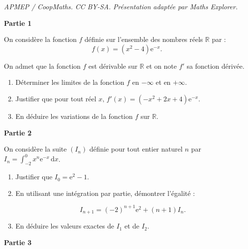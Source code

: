 \documentclass[10pt]{article}
\providecommand{\R}{\mathbb{R}}
\providecommand{\e}{{\mathrm{e}}}
\begin{document}
\noindent\textit{APMEP / CoopMaths. CC BY-SA. Présentation adaptée par Maths Explorer.}\par\medskip
\medskip

\textbf{Partie 1}

\medskip

On considère la fonction $f$ définie sur l'ensemble des nombres réels $\R$ par :
\[f(x) = \left(x^2 - 4\right)\e^{-x}.\]

On admet que la fonction $f$ est dérivable sur $\R$ et on note $f'$ sa fonction dérivée.

\medskip

\begin{enumerate}
\item Déterminer les limites de la fonction $f$ en $-\infty$ et en $+\infty$.
\item Justifier que pour tout réel $x,\, f'(x) = \left(-x^2 + 2x + 4\right)\e^{-x}$.
\item En déduire les variations de la fonction $f$ sur $\R$.
\end{enumerate}

\bigskip

\textbf{Partie 2}

\medskip

On considère la suite $(I_n)$ définie pour tout entier naturel $n$ par $I_n = \displaystyle\int_{-2}^0 x^n\e^{-x}\, \text{d}x$.

\medskip

\begin{enumerate}
\item Justifier que $I_0 = \e^2 - 1$.
\item En utilisant une intégration par partie, démontrer l'égalité :

\[I_{n+1} = (- 2)^{n+1} \text{e}^2 + (n + 1)I_n.\]

\item En déduire les valeurs exactes de $I_1$ et de $I_2$.
\end{enumerate}

\medskip

\textbf{Partie 3}

\medskip
\end{document}
